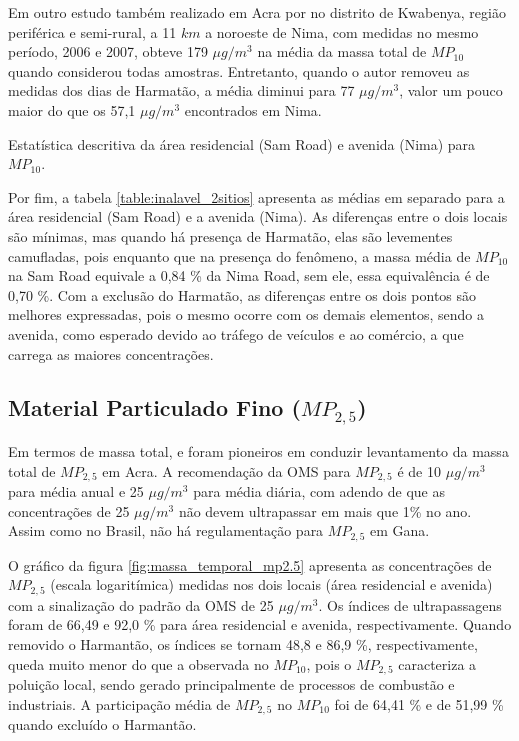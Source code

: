 Em outro estudo também realizado em Acra por \citet{aboh2009} no distrito de 
Kwabenya, região periférica e semi-rural, a 11 $km$ a noroeste de Nima, com 
medidas no mesmo período, 2006 e 2007, obteve 179 $\mu g / m^3$ 
na média da massa total de $MP_{10}$ quando considerou todas amostras. 
Entretanto, quando o autor removeu as medidas dos dias de Harmatão, 
a média diminui para 77 $\mu g / m^3$,
valor um pouco maior do que os 57,1 $\mu g/ m^3$ encontrados em Nima.

\begin{table}[H]
  \centering
    
  \caption{Estatística descritiva da área residencial (Sam Road) e avenida (Nima) 
           para $MP_{10}$. \label{table:inalavel_2sitios}}
\end{table}

Por fim, a tabela \ref{table:inalavel_2sitios} apresenta as médias em separado
para a área residencial (Sam Road) e a avenida (Nima). As diferenças 
entre o dois locais são mínimas, mas quando há presença de Harmatão, 
elas são levementes camufladas, pois enquanto que na presença do fenômeno, 
a massa média de $MP_{10}$ na Sam Road equivale a 0,84 \% da Nima Road, 
sem ele, essa equivalência é de 0,70 \%. Com a exclusão do Harmatão, as 
diferenças entre os dois pontos são melhores expressadas, pois o mesmo ocorre 
com os demais elementos, sendo a avenida, como esperado devido ao tráfego de 
veículos e ao comércio, a que carrega as maiores concentrações.

\newpage
\subsection{Material Particulado Fino ($MP_{2,5}$)}

\begin{table}[H]
  \centering
    
  \caption{
            \label{ddd}}
\end{table}



Em termos de massa total, \citet{ARKU2008} e \citet{DIONISIO2010} 
foram pioneiros em conduzir levantamento da massa total de $MP_{2,5}$ em 
Acra. A recomendação da OMS para $MP_{2,5}$ é de 10 $\mu g/m^3$ para média anual
e 25 $\mu g/m^3$ para média diária, com adendo de que as concentrações de 
25 $\mu g/m^3$ não devem ultrapassar em mais que 1\% no ano. Assim como no
Brasil, não há regulamentação para $MP_{2,5}$ em Gana. 

O gráfico da figura \ref{fig:massa_temporal_mp2.5} apresenta as concentrações
de $MP_{2,5}$ (escala logaritímica) medidas nos dois locais 
(área residencial e avenida) com a sinalização do padrão da OMS de 
25 $\mu g/m^3$. Os índices de ultrapassagens foram de 66,49 e 92,0 \% 
para área residencial e avenida, respectivamente. Quando removido o Harmantão, 
os índices se tornam 48,8 e 86,9 \%, respectivamente, queda muito menor do 
que a observada no $MP_{10}$, pois o $MP_{2,5}$ caracteriza a poluição local, 
sendo gerado principalmente de processos de combustão e industriais.
A participação média de $MP_{2,5}$ no $MP_{10}$ foi de 64,41 \% e de 
51,99 \% quando excluído o Harmantão.

